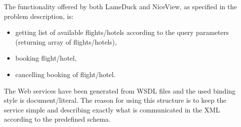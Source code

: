 The functionality offered by both LameDuck and NiceView, as specified in the problem description, is:
\begin{itemize}
\item getting list of available flights/hotels according to the query parameters (returning array of flights/hotels),
\item booking flight/hotel,
\item cancelling booking of flight/hotel.
\end{itemize}

The Web services have been generated from WSDL files and the used binding style is document/literal. The reason for using this structure is to keep the service simple and describing exactly what is communicated in the XML according to the predefined schema.
